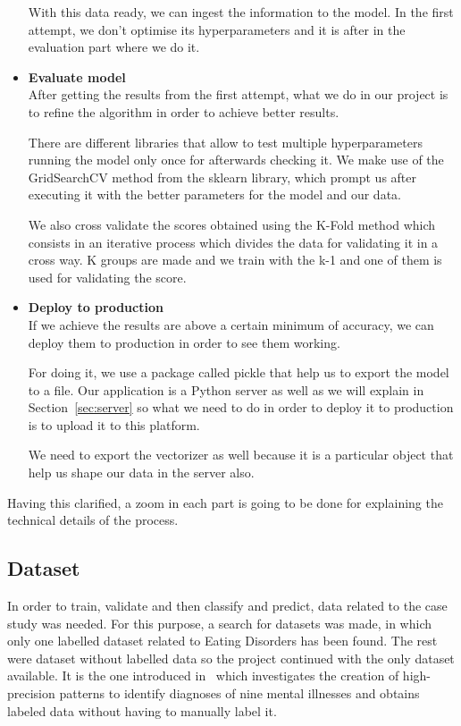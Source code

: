 \begin{itemize}
    With this data ready, we can ingest the information to the model. In the first attempt, we don't optimise its hyperparameters and it is after in the evaluation part where we do it.
    \item \textbf{Evaluate model}\\
    After getting the results from the first attempt, what we do in our project is to refine the algorithm in order to achieve better results.

    There are different libraries that allow to test multiple hyperparameters running the model only once for afterwards checking it. We make use of the GridSearchCV method from the sklearn library, which prompt us after executing it with the better parameters for the model and our data.

    We also cross validate the scores obtained using the K-Fold method which consists in an iterative process which divides the data for validating it in a cross way. K groups are made and we train with the k-1 and one of them is used for validating the score.
    \item \textbf{Deploy to production}\\
    If we achieve the results are above a certain minimum of accuracy, we can deploy them to production in order to see them working. 

    For doing it, we use a package called pickle that help us to export the model to a file. Our application is a Python server as well as we will explain in Section~\ref{sec:server} so what we need to do in order to deploy it to production is to upload it to this platform.

    We need to export the vectorizer as well because it is a particular object that help  us shape our data in the server also.\\

\end{itemize}

Having this clarified, a zoom in each part is going to be done for explaining the technical details of the process.

\subsection{Dataset}
\label{sec:dataset}
In order to train, validate and then classify and predict, data related to the case study was needed. For this purpose, a search for datasets was made, in which only one labelled dataset related to Eating Disorders has been found. The rest were dataset without labelled data so the project continued with the only dataset available. It is the one introduced in~\cite{https://doi.org/10.48550/arxiv.1806.05258} which investigates the creation of high-precision patterns to identify diagnoses of nine mental illnesses and obtains labeled data without having to manually label it.

